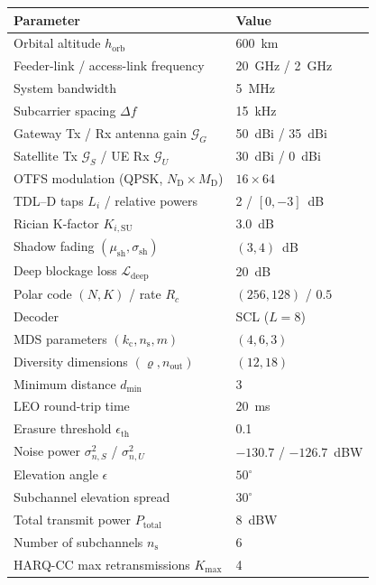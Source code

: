 \begin{center}
\begin{tabular}{@{}ll@{}}
\toprule
\textbf{Parameter} & \textbf{Value} \\
\midrule
Orbital altitude $h_{\mathrm{orb}}$ & 600~km \\
Feeder-link / access-link frequency & 20~GHz / 2~GHz \\
System bandwidth & 5~MHz \\
Subcarrier spacing $\Delta f$ & 15~kHz \\
Gateway Tx / Rx antenna gain $\mathcal{G}_G$ & 50~dBi / 35~dBi \\
Satellite Tx $\mathcal{G}_S$ / UE Rx $\mathcal{G}_U$ & 30~dBi / 0~dBi \\
OTFS modulation (QPSK, $N_{\mathrm{D}} \times M_{\mathrm{D}}$) & $16 \times 64$ \\
TDL--D taps $L_i$ / relative powers & 2 / $[0, -3]$~dB \\
Rician K-factor $K_{i,\mathrm{SU}}$ & 3.0~dB \\
Shadow fading $(\mu_{\mathrm{sh}}, \sigma_{\mathrm{sh}})$ & $(3, 4)$~dB \\
Deep blockage loss $\mathcal{L}_{\mathrm{deep}}$ & 20~dB \\
Polar code $(N, K)$ / rate $R_c$ & $(256, 128)$ / $0.5$ \\
Decoder & SCL ($L = 8$) \\
MDS parameters $(k_{\mathrm{c}}, n_{\mathrm{s}}, m)$ & $(4, 6, 3)$ \\
Diversity dimensions $(\varrho, n_{\text{out}})$ & $(12, 18)$ \\
Minimum distance $d_{\min}$ & 3 \\
LEO round-trip time  & 20~ms \\
Erasure threshold $\epsilon_{\mathrm{th}}$ & 0.1 \\
Noise power $\sigma_{n,S}^2$ / $\sigma_{n,U}^2$ & $-130.7$ / $-126.7$~dBW \\
Elevation angle $\epsilon$ & $50^{\circ}$ \\
{\color{blue}Subchannel elevation spread} & {\color{blue}$30^{\circ}$} \\
Total transmit power $P_{\mathrm{total}}$ & 8~dBW \\
Number of subchannels $n_{\mathrm{s}}$ & 6 \\
{\color{blue}HARQ-CC max retransmissions $K_{\max}$} & {\color{blue}4} \\
\bottomrule
\end{tabular}
\end{center}

